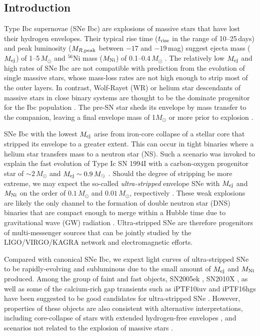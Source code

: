 \documentclass[twocolumn]{aastex63}
\begin{document}
\begin{CJK*}{UTF8}{gbsn}
\vspace{1em}

\section{Introduction}
Type Ibc supernovae (SNe Ibc) are explosions of massive stars that have lost their 
hydrogen envelopes. Their typical rise time ($t_{\rm rise}$ in the range of 10--25\,days) and peak 
luminosity ($M_{R\rm , peak}$ between $-17$ and $-19$\,mag) suggest ejecta mass ($M_{\rm ej}$) of 
1--5\,$M_\odot$ and $^{56}$Ni mass ($M_{\rm Ni}$) of 0.1--0.4\,$M_\odot$ \citep{Drout2011, 
Taddia2018, Prentice2019}. The relatively low $M_{\rm ej}$ and high rates of SNe Ibc are not compatible 
with prediction from the evolution of single massive stars, whose mass-loss rates are not high enough 
to strip most of the outer layers. In contrast, Wolf-Rayet (WR) or helium star descendants of massive 
stars in close binary systems are thought to be the dominate progenitor for the Ibc population 
\citep{Smith2011, Dessart2012, Lyman2016}. The pre-SN star sheds its envelope by mass transfer to 
the companion, leaving a final envelope mass of 1$M_\odot$ or more prior to explosion 
\citep{Yoon2010}.

SNe Ibc with the lowest $M_{\rm ej}$ arise from iron-core collapse of a stellar core that stripped its 
envelope to a greater extent. This can occur in tight binaries where a helium star transfers 
mass to a neutron star (NS). Such a scenario was invoked to explain the fast evolution of Type Ic SN 
1994I with a carbon-oxygen progenitor star of $\sim 2\,M_\odot$ and $M_{\rm ej }\sim 0.9\, M_\odot$ 
\citep{Nomoto1994}. Should the degree of stripping be more extreme, we may 
expect the so-called \textit{ultra-stripped} envelope SNe with $M_{\rm ej}$ and $M_{\rm Ni} $ on the 
order of $0.1 \, M_\odot$ and $0.01 \, M_\odot$, respectively \citep{Tauris2013,Tauris2015, Suwa2015}. 
These weak explosions are likely the only channel to the formation of double neutron star 
(DNS) binaries that are compact enough to merge within a Hubble time due to gravitational 
wave (GW) radiation \citep{Tauris2017}. Ultra-stripped SNe are therefore progenitors of 
multi-messenger sources that can be  jointly studied by the LIGO/VIRGO/KAGRA network  
\citep{LIGO2018} and electromagnetic efforts.

Compared with canonical SNe Ibc, we expext light curves of ultra-stripped SNe to be rapidly-evolving 
and subluminous due to the small amount of $M_{\rm ej}$ and $M_{\rm Ni}$ produced. Among the 
group of faint and fast objects, SN2005ek \citep{Drout2013}, SN2010X \cite{Kasliwal2010}, as well as 
some of the calcium-rich gap transients such as iPTF10iuv \citep{Kasliwal2012} and iPTF16hgs 
\citep{DeKC2018} have been suggested to be good candidates for ultra-stripped SNe 
\citep{Moriya2017}. However, properties of these objects are also consistent with alternative 
interpretations, including core-collapse of stars with extended hydrogen-free envelopes
\citep{Kleiser2014, KleiserFuller2018, KleiserKasen2018}, and scenarios not related to the explosion of 
massive stars \citep{Metzger2009, Shen2010, Sim2012, Margalit2016}.


\end{CJK*}
\end{document}
